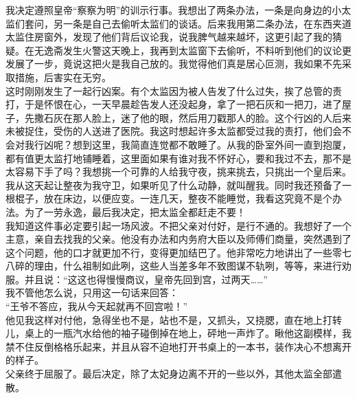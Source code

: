 我决定遵照皇帝“察察为明”的训示行事。我想出了两条办法，一条是向身边的小太监们套问，另一条是自己去偷听太监们的谈话。后来我用第二条办法，在东西夹道太监住房窗外，发现了他们背后议论我，说我脾气越来越坏，这更引起了我的猜疑。在无逸斋发生火警这天晚上，我再到太监窗下去偷听，不料听到他们的议论更发展了一步，竟说这把火是我自己放的。我觉得他们真是居心叵测，我如果不先采取措施，后害实在无穷。\\

这时刚刚发生了一起行凶案。有个太监因为被人告发了什么过失，挨了总管的责打，于是怀恨在心，一天早晨趁告发人还没起身，拿了一把石灰和一把刀，进了屋子，先撒石灰在那人脸上，迷了他的眼，然后用刀戳那人的脸。这个行凶的人后来未被捉住，受伤的人送进了医院。我这时想起许多太监都受过我的责打，他们会不会对我行凶呢？想到这里，我简直连觉都不敢睡了。从我的卧室外间一直到抱厦，都有值更太监打地铺睡着，这里面如果有谁对我不怀好心，要和我过不去，那不是太容易下手了吗？我想挑一个可靠的人给我守夜，挑来挑去，只挑出一个皇后来。我从这天起让整夜为我守卫，如果听见了什么动静，就叫醒我。同时我还预备了一根棍子，放在床边，以便应变。一连几天，整夜不能睡觉，我看这究竟不是个办法。为了一劳永逸，最后我决定，把太监全都赶走不要！\\

我知道这件事必定要引起一场风波。不把父亲对付好，是行不通的。我想好了一个主意，亲自去找我的父亲。他没有办法和内务府大臣以及师傅们商量，突然遇到了这个问题，他的口才就更加不行，变得更加结巴了。他非常吃力地讲出了一些零七八碎的理由，什么祖制如此咧，这些人当差多年不致图谋不轨咧，等等，来进行劝服。并且说：“这这也得慢慢商议，皇帝先回到宫，过两天……”\\

我不管他怎么说，只用这一句话来回答：\\

“王爷不答应，我从今天起就再不回宫啦！”\\

他见我这样对付他，急得坐也不是，站也不是，又抓头，又挠腮，直在地上打转儿，桌上的一瓶汽水给他的袖子碰倒掉在地上，砰地一声炸了。瞅他这副模样，我禁不住反倒格格乐起来，并且从容不迫地打开书桌上的一本书，装作决心不想离开的样子。\\

父亲终于屈服了。最后决定，除了太妃身边离不开的一些以外，其他太监全部遣散。\\
